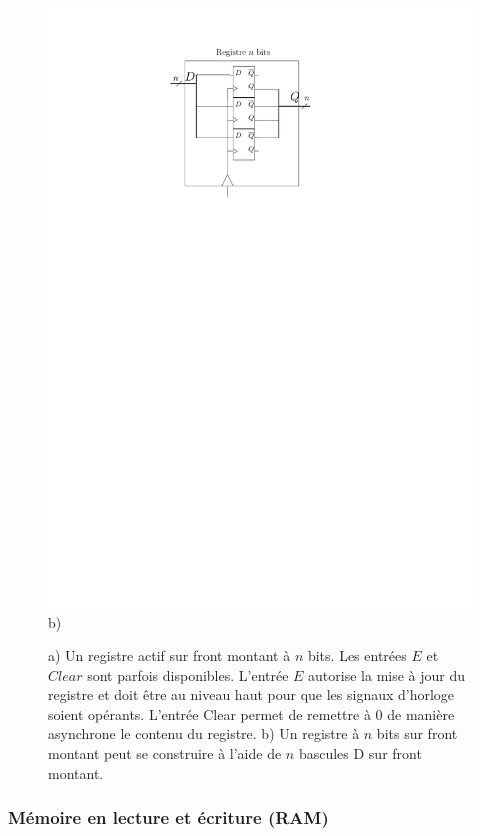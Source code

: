 \begin{figure}[htbp]
\begin{minipage}[c]{.4\linewidth}
\includegraphics[width=\columnwidth]{Figs/registre_inner.pdf}
\\\centering b)
\end{minipage}
\caption{\label{fig:registre} a) Un registre actif sur front montant à $n$ bits. Les entrées $E$ et $Clear$ sont parfois disponibles. L'entrée $E$ autorise la mise à jour du registre et doit être au niveau haut pour que les signaux d'horloge soient opérants. L'entrée Clear permet de remettre à $0$ de manière asynchrone le contenu du registre. b) Un registre à $n$ bits sur front montant peut se construire à l'aide de $n$ bascules D sur front montant.}
\end{figure}


\subsubsection{Mémoire en lecture et écriture (RAM)}

